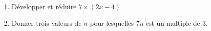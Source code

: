
\begin{exercice}\label{exo2smath-0145}

    \begin{enumerate}
        \item
            Développer et réduire \( 7\times ( 2x-4  )\)
        \item
            Donner trois valeurs de \( n\) pour lesquelles \( 7n\) est un multiple de \( 3\).
    \end{enumerate}

\end{exercice}
